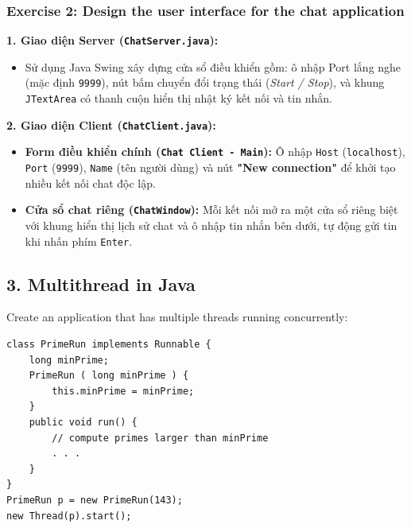\documentclass[11pt,a4paper]{article}
\begin{document}
\subsubsection*{Exercise 2: Design the user interface for the chat application}

\begin{solutionbox}[title=Báo cáo \& Bài làm: Exercise 2 -- Thiết kế Giao diện Ứng dụng Chat]
\textbf{1. Giao diện Server (\texttt{ChatServer.java}):}
\begin{itemize}
    \item Sử dụng Java Swing xây dựng cửa sổ điều khiển gồm: ô nhập Port lắng nghe (mặc định \texttt{9999}), nút bấm chuyển đổi trạng thái (\textit{Start / Stop}), và khung \texttt{JTextArea} có thanh cuộn hiển thị nhật ký kết nối và tin nhắn.
\end{itemize}

\textbf{2. Giao diện Client (\texttt{ChatClient.java}):}
\begin{itemize}
    \item \textbf{Form điều khiển chính (\texttt{Chat Client - Main}):} Ô nhập \texttt{Host} (\texttt{localhost}), \texttt{Port} (\texttt{9999}), \texttt{Name} (tên người dùng) và nút \textbf{"New connection"} để khởi tạo nhiều kết nối chat độc lập.
    \item \textbf{Cửa sổ chat riêng (\texttt{ChatWindow}):} Mỗi kết nối mở ra một cửa sổ riêng biệt với khung hiển thị lịch sử chat và ô nhập tin nhắn bên dưới, tự động gửi tin khi nhấn phím \texttt{Enter}.
\end{itemize}
\end{solutionbox}

\vspace{0.4cm}

\subsection*{3. Multithread in Java}
\noindent Create an application that has multiple threads running concurrently:
\begin{lstlisting}
class PrimeRun implements Runnable {
    long minPrime;
    PrimeRun ( long minPrime ) {
        this.minPrime = minPrime;
    }
    public void run() {
        // compute primes larger than minPrime
        . . .
    }
}
PrimeRun p = new PrimeRun(143);
new Thread(p).start();
\end{lstlisting}
\end{document}
